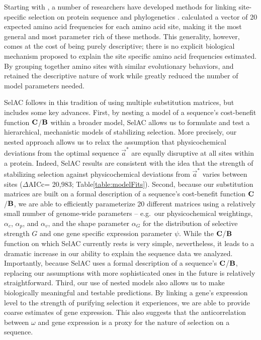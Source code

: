 \documentclass[onecolumn,letterpaper,fleqn,nogrid]{myMBE}%
\newcommand{\PC}{physicochemical\xspace}
\newcommand{\Cost}{\ensuremath{\text{\textbf{C}}}\xspace}
\newcommand{\DeltaAICc}{\ensuremath{\Delta\text{AICc}}\xspace}
\newcommand{\Func}{\ensuremath{\text{\textbf{B}}}\xspace}
\newcommand{\selac}{SelAC\xspace}
\newcommand{\alphac}{\ensuremath{\alpha_c}\xspace}
\newcommand{\alphag}{\ensuremath{\alpha_G}\xspace}
\newcommand{\alphap}{\ensuremath{\alpha_p}\xspace}
\newcommand{\alphav}{\ensuremath{\alpha_v}\xspace}
\newcommand{\aoptvec}{\ensuremath{\Vec{a}^*}\xspace}
\begin{document}
Starting with \citet{HalpernAndBruno1998}, a number of researchers have developed methods for linking site-specific selection on protein sequence and phylogenetics \citep[e.g.~][]{KoshiEtAl1999,DimmicEtAl2000,KoshiAndGoldstein2001,RobinsonEtAl2003,LartillotAndPhilippe2004,ThorneEtAl2012,RodrigueAndLartillot2014}.
\citet{HalpernAndBruno1998} calculated a vector of 20 expected amino acid frequencies for each amino acid site, making it the most general and most parameter rich of these methods.
This generality, however, comes at the cost of being purely descriptive; there is no explicit biological mechanism proposed to explain the site specific amino acid frequencies estimated.
By grouping together amino sites with similar evolutionary behaviors, \citet{LartillotAndPhilippe2004} and \citet{RodrigueAndLartillot2014} retained the descriptive nature of \citet{HalpernAndBruno1998} work while greatly reduced the number of model parameters needed.

\selac follows in this tradition of using multiple substitution matrices, but includes some key advances.
First, by nesting a model of a sequence's cost-benefit function \Cost/\Func within a broader model, \selac allows us to formulate and test a hierarchical, mechanistic models of stabilizing selection.
More precisely, our nested approach allows us to relax the assumption that \PC deviations from the optimal sequence \aoptvec are equally disruptive at all sites within a protein.
Indeed, \selac results are consistent with the idea that the strength of stabilizing selection against \PC deviations from \aoptvec varies between sites (\DeltaAICc = 20,983; Table\ref{table:modelFits}).
Second, because our substitution matrices are built on a formal description of a sequence's cost-benefit function \Cost/\Func, we are able to efficiently parameterize 20 different matrices using a relatively small number of genome-wide parameters -- e.g.~our \PC weightings, \alphac, \alphap, and \alphav, and the shape parameter \alphag for the distribution of selective strength $G$ and one gene specific expression parameter $\psi$.
While the \Cost/\Func function on which \selac currently rests is very simple, nevertheless, it leads to a dramatic increase in our ability to explain the sequence data we analyzed.
Importantly, because \selac uses a formal description of a sequence's \Cost/\Func, replacing our assumptions with more sophisticated ones in the future is relatively straightforward.
Third, our use of nested models also allows us to make biologically meaningful and testable predictions.
By linking a gene's expression level to the strength of purifying selection it experiences, we are able to provide coarse estimates of gene expression.
This also suggests that the anticorrelation between $\omega$ and gene expression is a proxy for the nature of selection on a sequence.
\end{document}
